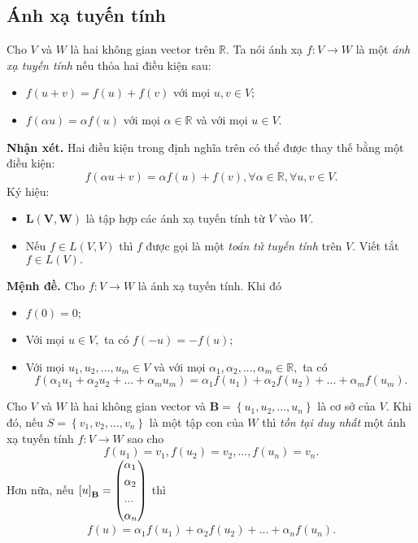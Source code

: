 \subsection{Ánh xạ tuyến tính}
Cho $V$ và $W$ là hai không gian vector trên $\mathbb{R}.$ Ta nói ánh xạ $f: V \to W$ là một \textit{ánh xạ tuyến tính} nếu thỏa hai điều kiện sau:
\begin{itemize}
\item $f \left( {u + v} \right) = f \left( u \right) + f \left( v \right)$ với mọi $u, v \in V;$
\item $f \left( {\alpha u} \right) = \alpha f \left( u \right)$ với mọi $\alpha \in \mathbb{R}$ và với mọi $u \in V.$
\end{itemize}
\textbf{Nhận xét.} Hai điều kiện trong định nghĩa trên có thể được thay thế bằng một điều kiện:
$$f \left( {\alpha u + v} \right) = \alpha f \left( u \right) + f \left( v \right), \forall \alpha \in \mathbb{R}, \forall u, v \in V.$$
Ký hiệu:
\begin{itemize}
\item $\mathbf{L \left( {V, W} \right)}$ là tập hợp các ánh xạ tuyến tính từ $V$ vào $W.$
\item Nếu $f \in L \left( {V, V} \right)$ thì $f$ được gọi là một \textit{toán tử tuyến tính} trên $V.$ Viết tắt $f \in L \left( V \right).$
\end{itemize}
\begin{mybox}
\textbf{Mệnh đề.} Cho $f: V \to W$ là ánh xạ tuyến tính. Khi đó
\begin{itemize}
\item $f \left( 0 \right) = 0;$
\item Với mọi $u \in V,$ ta có $f \left( {- u} \right) = - f \left( u \right);$
\item Với mọi $u_1, u_2, ..., u_m \in V$ và với mọi $\alpha_1, \alpha_2, ..., \alpha_m \in \mathbb{R},$ ta có
$$f\left( {{\alpha _1}{u_1} + {\alpha _2}{u_2} + ... + {\alpha _m}{u_m}} \right) = {\alpha _1}f\left( {{u_1}} \right) + {\alpha _2}f\left( {{u_2}} \right) + ... + {\alpha _m}f\left( {{u_m}} \right).$$
\end{itemize}
\end{mybox}
\begin{mybox}
\begin{theorem}
Cho $V$ và $W$ là hai không gian vector và $\mathbf{B} = \left\{ {u_1, u_2, ..., u_n} \right\}$ là cơ sở của $V.$ Khi đó, nếu $S = \left\{ {v_1, v_2, ..., v_n} \right\}$ là một tập con của $W$ thì \textit{tồn tại duy nhất} một ánh xạ tuyến tính $f: V \to W$ sao cho
$$f\left( {{u_1}} \right) = {v_1},f\left( {{u_2}} \right) = {v_2},...,f\left( {{u_n}} \right) = {v_n}.$$
Hơn nữa, nếu ${\left[ u \right]_{\mathbf{B}}} = \left( \begin{gathered}
  {\alpha _1} \hfill \\
  {\alpha _2} \hfill \\
  ... \hfill \\
  {\alpha _n} \hfill \\ 
\end{gathered}  \right)$ thì 
$$f\left( u \right) = {\alpha _1}f\left( {{u_1}} \right) + {\alpha _2}f\left( {{u_2}} \right) + ... + {\alpha _n}f\left( {{u_n}} \right).$$
\end{theorem}
\end{mybox}

